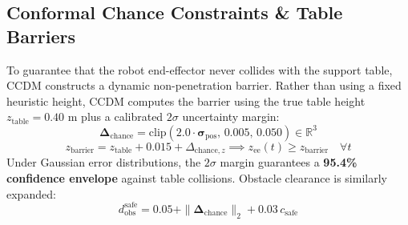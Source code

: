 \documentclass[10pt,a4paper]{article}
\begin{document}
\subsection{Conformal Chance Constraints \& Table Barriers}
To guarantee that the robot end-effector never collides with the support table, CCDM constructs a dynamic non-penetration barrier. Rather than using a fixed heuristic height, CCDM computes the barrier using the true table height $z_{\mathrm{table}} = 0.40\text{ m}$ plus a calibrated $2\sigma$ uncertainty margin:
\begin{equation}
\bm{\Delta}_{\mathrm{chance}} = \mathrm{clip}\left(2.0 \cdot \bm{\sigma}_{\mathrm{pos}}, \, 0.005, \, 0.050\right) \in \mathbb{R}^3
\label{eq:delta_chance}
\end{equation}
\begin{equation}
z_{\mathrm{barrier}} = z_{\mathrm{table}} + 0.015 + \Delta_{\mathrm{chance}, z} \implies z_{\mathrm{ee}}(t) \ge z_{\mathrm{barrier}} \quad \forall t
\label{eq:z_barrier}
\end{equation}
Under Gaussian error distributions, the $2\sigma$ margin guarantees a \textbf{95.4\% confidence envelope} against table collisions. Obstacle clearance is similarly expanded:
\begin{equation}
d_{\mathrm{obs}}^{\mathrm{safe}} = 0.05 + \|\bm{\Delta}_{\mathrm{chance}}\|_2 + 0.03 \, c_{\mathrm{safe}}
\label{eq:d_obs_safe}
\end{equation}
\end{document}

